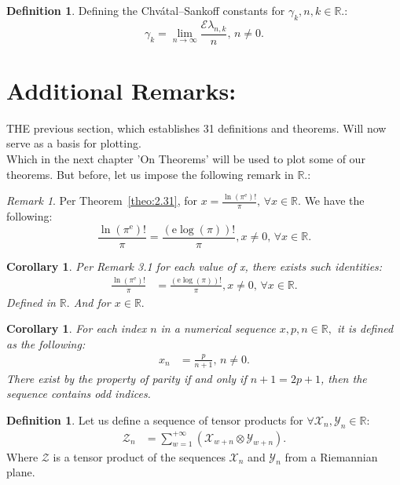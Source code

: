 \documentclass[10pt]{article}
\theoremstyle{plain}
\newtheorem{corollary}[theorem]{Corollary}
\theoremstyle{definition}
\newtheorem{definition}[theorem]{Definition}
\theoremstyle{remark}
\newtheorem{remark}[theorem]{Remark}
\begin{document}
\begin{definition}
	Defining the Chvátal–Sankoff constants for $\gamma_k, n, k \in \mathbb{R}.$:
	\begin{equation}
		\gamma_k = \lim_{n \to \infty} \frac{\mathrm{\mathcal{E}}{\lambda_{n, k}}}{n}, \, n \neq 0.
	\end{equation}
\end{definition}

\section{Additional Remarks:}
\lettrine[lines=2, lhang=0.1, loversize=0.2]{T}HE previous section, which establishes 31 definitions and theorems. Will now serve as a basis for plotting.\\
Which in the next chapter 'On Theorems' will be used to plot some of our theorems. But before, let us impose the following remark in $\mathbb{R}.$:

\begin{remark}
	Per Theorem~\ref{theo:2.31}, for $x = \frac{\ln(\pi^\mathrm{e})!}{\pi}, \, \forall x \in \mathbb{R}.$ We have the following:
	\begin{equation}
		\frac{\ln(\pi^\mathrm{e})!}{\pi} = \frac{(\mathrm{e} \log(\pi))!}{\pi}, x \neq 0, \, \forall x \in \mathbb{R}.
	\end{equation}
\end{remark}

\begin{corollary}
	Per Remark 3.1 for each value of x, there exists such identities:
	\begin{align*}
		\frac{\ln(\pi^\mathrm{e})!}{\pi} &= \frac{(\mathrm{e} \log(\pi))!}{\pi}, x \neq 0, \, \forall x \in \mathbb{R}.
	\end{align*}
	Defined in $\mathbb{R}.$ And for $x \in \mathbb{R}.$
\end{corollary}

\begin{corollary}
	For each index $n$ in a numerical sequence $x, p, n \in \mathbb{R},$ it is defined as the following:
	\begin{align*}
		x_n &= \frac{p}{n+1}, \, n \neq 0.
	\end{align*}
	There exist by the property of parity if and only if $n+1 = 2p + 1$, then the sequence contains  odd indices.
\end{corollary}

\begin{definition}
	Let us define a sequence of tensor products for $\forall \mathcal{X}_n, \mathcal{Y}_n \in \mathbb{R}$:
	\begin{align*}
		\mathcal{Z}_n &= \sum_{w=1}^{+\infty} (\mathcal{X}_{w+n} \otimes \mathcal{Y}_{w+n}).
	\end{align*}
	Where $\mathcal{Z}$ is a tensor product of the sequences $\mathcal{X}_n$ and $\mathcal{Y}_n$ from a Riemannian plane.
\end{definition}
\end{document}
